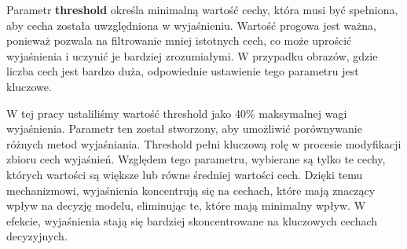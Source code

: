Parametr \textbf{threshold} określa minimalną wartość cechy, która musi być spełniona, aby cecha została uwzględniona w wyjaśnieniu.
Wartość progowa jest ważna, ponieważ pozwala na filtrowanie mniej istotnych cech, co może uprościć wyjaśnienia i uczynić je bardziej zrozumiałymi.
W przypadku obrazów, gdzie liczba cech jest bardzo duża, odpowiednie ustawienie tego parametru jest kluczowe.

W tej pracy ustaliliśmy wartość threshold jako 40\% maksymalnej wagi wyjaśnienia.
Parametr ten został stworzony, aby umożliwić porównywanie różnych metod wyjaśniania.
Threshold pełni kluczową rolę w procesie modyfikacji zbioru cech wyjaśnień.
Względem tego parametru, wybierane są tylko te cechy, których wartości są większe lub równe średniej wartości cech.
Dzięki temu mechanizmowi, wyjaśnienia koncentrują się na cechach, które mają znaczący wpływ na decyzję modelu, eliminując te, które mają minimalny wpływ.
W efekcie, wyjaśnienia stają się bardziej skoncentrowane na kluczowych cechach decyzyjnych.

